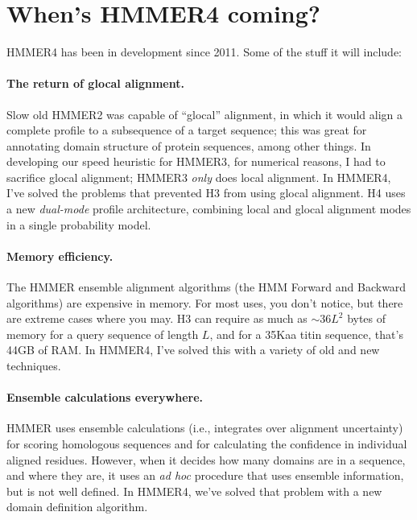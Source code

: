 \section{When's HMMER4 coming?}

HMMER4 has been in development since 2011. Some of the stuff it will include:

\paragraph{The return of glocal alignment.} Slow old HMMER2 was
 capable of ``glocal'' alignment, in which it would align a complete
 profile to a subsequence of a target sequence; this was great for
 annotating domain structure of protein sequences, among other things.
 In developing our speed heuristic for HMMER3, for numerical reasons,
 I had to sacrifice glocal alignment; HMMER3 \emph{only} does local
alignment. In HMMER4, I've solved the problems that prevented H3 from
using glocal alignment. H4 uses a new \emph{dual-mode} profile
architecture, combining local and glocal alignment modes in a single
probability model.

\paragraph{Memory efficiency.} The HMMER ensemble alignment
algorithms (the HMM Forward and Backward algorithms) are expensive in
memory. For most uses, you don't notice, but there are extreme cases
where you may. H3 can require as much as $\sim 36L^2$ bytes of memory
for a query sequence of length $L$, and for a 35Kaa titin sequence,
that's 44GB of RAM. In HMMER4, I've solved this with a variety of old
and new techniques.

\paragraph{Ensemble calculations everywhere.} HMMER uses ensemble
calculations (i.e., integrates over alignment uncertainty) for scoring
homologous sequences and for calculating the confidence in individual
aligned residues. However, when it decides how many domains are in a
sequence, and where they are, it uses an \emph{ad hoc} procedure that
uses ensemble information, but is not well defined. In HMMER4, we've
solved that problem with a new domain definition algorithm.

